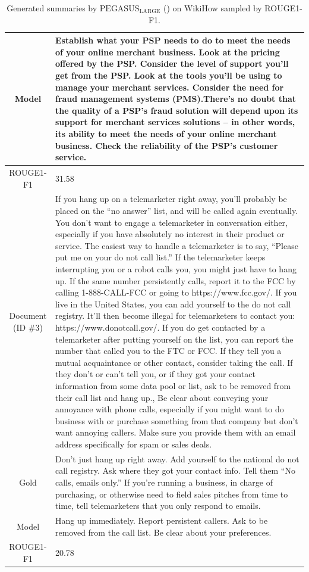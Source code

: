 \begin{table}[bth!]
\begin{tabular}{c|p{}}
\\ \hline
Model & 
Establish what your PSP needs to do to meet the needs of your online merchant business. Look at the pricing offered by the PSP. Consider the level of support you’ll get from the PSP. Look at the tools you’ll be using to manage your merchant services. Consider the need for fraud management systems (PMS).There’s no doubt that the quality of a PSP’s fraud solution will depend upon its support for merchant services solutions – in other words, its ability to meet the needs of your online merchant business. Check the reliability of the PSP’s customer service.
\\ \hline
ROUGE1-F1 & 
31.58
\\ \hline
\makecell{Document\\(ID \#3)} & 
If you hang up on a telemarketer right away, you’ll probably be placed on the “no answer” list, and will be called again eventually. You don’t want to engage a telemarketer in conversation either, especially if you have absolutely no interest in their product or service. The easiest way to handle a telemarketer is to say, “Please put me on your do not call list.” If the telemarketer keeps interrupting you or a robot calls you, you might just have to hang up. If the same number persistently calls, report it to the FCC by calling 1-888-CALL-FCC or going to https://www.fcc.gov/. If you live in the United States, you can add yourself to the do not call registry. It'll then become illegal for telemarketers to contact you: https://www.donotcall.gov/. If you do get contacted by a telemarketer after putting yourself on the list, you can report the number that called you to the FTC or FCC. If they tell you a mutual acquaintance or other contact, consider taking the call. If they don’t or can’t tell you, or if they got your contact information from some data pool or list, ask to be removed from their call list and hang up., Be clear about conveying your annoyance with phone calls, especially if you might want to do business with or purchase something from that company but don’t want annoying callers. Make sure you provide them with an email address specifically for spam or sales deals.
\\ \hline
Gold & 
Don’t just hang up right away. Add yourself to the national do not call registry. Ask where they got your contact info. Tell them “No calls, emails only.” If you’re running a business, in charge of purchasing, or otherwise need to field sales pitches from time to time, tell telemarketers that you only respond to emails.
\\ \hline
Model & 
Hang up immediately. Report persistent callers. Ask to be removed from the call list. Be clear about your preferences.
\\ \hline
ROUGE1-F1 & 
20.78
\\ \hline
\end{tabular}
\caption{Generated summaries by $\text{PEGASUS}_{\text{LARGE}}$ (\gnews) on WikiHow sampled by ROUGE1-F1.}
\end{table}
